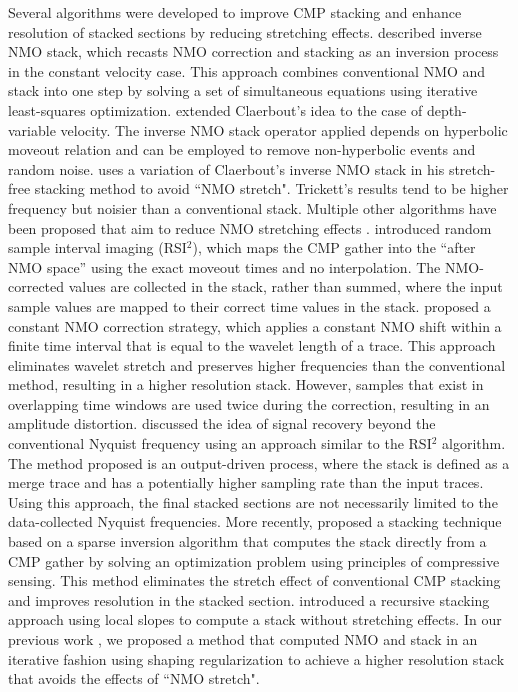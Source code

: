 Several algorithms were developed to improve CMP stacking and enhance resolution 
of stacked sections by reducing stretching effects. 
\cite{claerbout} described inverse NMO stack, which recasts 
NMO correction and stacking as an inversion process in the constant velocity case. This approach 
combines conventional NMO and stack into one step by solving a set of simultaneous equations using
iterative least-squares optimization. \cite{sun} extended Claerbout's idea to the case of depth-variable 
velocity. The inverse NMO stack operator applied depends on hyperbolic moveout relation and can 
be employed to remove non-hyperbolic events and random noise. \cite{trickett} uses a variation of 
Claerbout's inverse NMO stack in his stretch-free stacking method to avoid ``NMO stretch". 
Trickett's results tend to be higher frequency but noisier 
than a conventional stack. Multiple other algorithms have been proposed that aim to reduce 
NMO stretching effects \cite[]{byun,hicks,hilterman,rupert,perroud,masoomzadeh,zhang,kazemi}.
\cite{wisecup} introduced random sample interval imaging (RSI$^2$), which
maps the CMP gather into the ``after NMO space'' using the exact moveout times and no 
interpolation. The NMO-corrected values are collected in the stack, rather than 
summed, where the input sample values are mapped to their correct time values in the stack. 
\cite{shatilo} proposed a constant NMO correction strategy, which applies a constant NMO shift 
within a finite time interval that is equal to the wavelet length of a trace. This approach eliminates wavelet 
stretch and preserves higher frequencies than the conventional method, resulting in a higher resolution stack. However, 
samples that exist in overlapping time windows are used twice during the correction, resulting in 
an amplitude distortion. \cite{stark} discussed the idea of signal recovery beyond the conventional Nyquist 
frequency using an approach similar to the RSI$^2$ algorithm. The method proposed is an output-driven process, 
where the stack is defined as a merge trace and has a potentially higher sampling rate than the input 
traces. Using this approach, the final stacked sections are not necessarily limited to the data-collected Nyquist frequencies. 
More recently, \cite{ma} proposed a stacking technique based 
on a sparse inversion algorithm that computes the stack directly from a CMP gather by solving an optimization 
problem using principles of compressive sensing. This method eliminates the stretch effect of conventional 
CMP stacking and improves resolution in the stacked section. \cite{silva} introduced a recursive stacking approach using local slopes to compute a stack without stretching effects. In our previous work \cite[]{regimbal}, we proposed a method that
computed NMO and stack in an iterative fashion using shaping regularization to achieve a higher resolution 
stack that avoids the effects of ``NMO stretch". 

